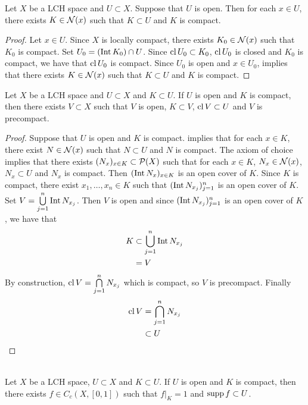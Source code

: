 \documentclass{book}
\begin{document}
\begin{ex}
	Let $X$ be a LCH space and $U \subset X$. Suppose that $U$ is open. Then for each $x \in U$, there exists $K \in \mathcal{N}(x)$ such that $K \subset U$ and $K$ is compact.
\end{ex}

\begin{proof}
	Let $x \in U$. Since $X$ is locally compact, there exists $K_0 \in \mathcal{N}(x)$ such that $K_0$ is compact. Set $U_0 = (\operatorname{Int} K_0) \cap U$. Since $\operatorname{cl} U_0 \subset K_0$, $\operatorname{cl} U_0$ is closed and $K_0$ is compact, we have that $\operatorname{cl} U_0$ is compact. Since $U_0$ is open and $x \in U_0$,  implies that there exists $K \in \mathcal{N}(x)$ such that $K \subset U$ and $K$ is compact.
\end{proof}

\begin{ex}
	Let $X$ be a LCH space and $U \subset X$ and $K \subset U$. If $U$ is open and $K$ is compact, then there exists $V \subset X$ such that $V$ is open, $K \subset V$, $\operatorname{cl} V \subset U$ and $V$ is precompact. 
\end{ex}

\begin{proof}
	Suppose that $U$ is open and $K$ is compact.  implies that for each $x \in K$, there exist $N \in \mathcal{N}(x)$ such that $N \subset U$ and $N$ is compact. The axiom of choice implies that there exists $(N_x)_{x \in K} \subset \mathcal{P}(X)$ such that for each $x \in K$, $N_x \in \mathcal{N}(x)$, $N_x \subset U$ and $N_x$ is compact. Then $(\operatorname{Int} N_x)_{x \in K}$ is an open cover of $K$. Since $K$ is compact, there exist $x_1, \ldots, x_n \in K$ such that $(\operatorname{Int} N_{x_j})_{j=1}^n$ is an open cover of $K$. Set $V = \bigcup\limits_{j=1}^n \operatorname{Int} N_{x_j}$. Then $V$ is open and since $(\operatorname{Int} N_{x_j})_{j=1}^n$ is an open cover of $K$, we have that 
	\begin{align*}
		K
		& \subset \bigcup_{j=1}^n \operatorname{Int} N_{x_j} \\
		& = V \\
	\end{align*}
	By construction, $\operatorname{cl} V = \bigcap\limits_{j=1}^n N_{x_j}$ which is compact, so $V$ is precompact. Finally
	\begin{align*}
		\operatorname{cl} V
		& = \bigcap_{j=1}^n N_{x_j} \\
		& \subset U
	\end{align*}
\end{proof}

\begin{ex}  \\
	Let $X$ be a LCH space, $U \subset X$ and $K \subset U$. If $U$ is open and $K$ is compact, then there exists $f \in C_c(X, [0,1])$ such that $f|_K = 1$ and $\operatorname{supp} f \subset U$.
\end{ex}
\end{document}
